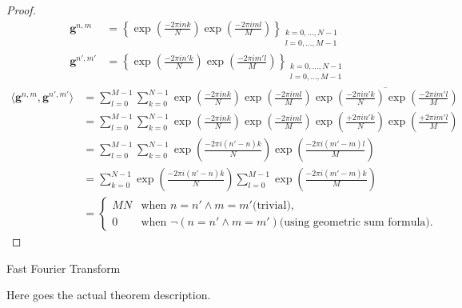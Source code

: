\begin{proof}
    \begin{align*} 
        \boldsymbol{g}^{n,m}    &= \left\{\exp\left({\frac{-2\pi ink}{N}}\right)\exp\left({\frac{-2\pi iml}{M}}\right)\right\}_{\substack{k=0,\ldots,N-1\\l=0,\ldots,M-1}}\\
        \boldsymbol{g}^{n',m'}  &= \left\{\exp\left({\frac{-2\pi in'k}{N}}\right)\exp\left({\frac{-2\pi im'l}{M}}\right)\right\}_{\substack{k=0,\ldots,N-1\\l=0,\ldots,M-1}}
    \end{align*}
    \begin{equation*}
        \begin{split}  
            \langle\boldsymbol{g}^{n,m},\boldsymbol{g}^{n',m'}\rangle &= \sum_{l=0}^{M-1}\sum_{k=0}^{N-1} \exp\left({\frac{-2\pi ink}{N}}\right)\exp\left({\frac{-2\pi iml}{M}}\right)\overline{\exp\left({\frac{-2\pi in'k}{N}}\right)\exp\left({\frac{-2\pi im'l}{M}}\right)}\\
            &= \sum_{l=0}^{M-1}\sum_{k=0}^{N-1} \exp\left({\frac{-2\pi ink}{N}}\right)\exp\left({\frac{-2\pi iml}{M}}\right)\exp\left({\frac{+2\pi in'k}{N}}\right)\exp\left({\frac{+2\pi im'l}{M}}\right)\\
            &= \sum_{l=0}^{M-1}\sum_{k=0}^{N-1} \exp\left({\frac{-2\pi i(n'-n)k}{N}}\right)\exp\left({\frac{-2\pi i(m'-m)l}{M}}\right)\\
            &= \sum_{k=0}^{N-1} \exp\left({\frac{-2\pi i(n'-n)k}{N}}\right)\sum_{l=0}^{M-1} \exp\left({\frac{-2\pi i(m'-m)k}{M}}\right)\\
            &= 
            \begin{cases}
                MN & \text{when $n = n' \wedge m=m'$}\text{(trivial)},\\
                0 & \text{when $\neg(n = n' \wedge m=m')$}\text{(using geometric sum formula)}.
            \end{cases}    
        \end{split}
    \end{equation*}
    

    
\end{proof}



Fast Fourier Transform \cite{fft_cooley_tukey} \cite{fft_good_pfa} \cite{wavelets_linear_algebra} \cite{algorithm_clrs}




\begin{Thm}\label{theorem:dft is unitary}
    
    Here goes the actual theorem description.
\end{Thm}







